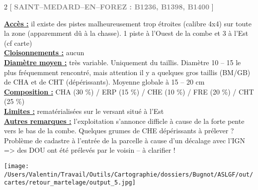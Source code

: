 \documentclass[a4paper,openany]{book}\usepackage[]{graphicx}\usepackage[]{color}
\begin{document}
\begin{multicols}{2}
[
\textcolor{gray}{
\textbf{
\large SAINT--MEDARD--EN--FOREZ : B1236, B1398, B1400
}}
]

\noindent\textbf{\underline{Accès :}} il existe des pistes malheureusement trop étroites (calibre 4x4) sur toute la zone (apparemment dû à la chasse). 1 piste à l'Ouest de la combe et 3 à l'Est (cf carte)\\

\noindent\textbf{\underline{Cloisonnements :}} aucun\\

\noindent\textbf{\underline{Diamètre moyen :}} très variable. Uniquement du taillis. Diamètre 10 -- 15 le plus fréquemment rencontré, mais attention il y a quelques gros taillis (BM/GB) de CHA et de CHT (dépérissants). Moyenne globale à 15 -- 20 cm\\

\noindent\textbf{\underline{Composition :}} CHA (30 \%) / ERP (15 \%) / CHE (10 \%) / FRE (20 \%) /  CHT (25 \%)\\

\noindent\textbf{\underline{Limites :}} rematérialisées sur le versant situé à l'Est\\

\noindent\textbf{\underline{Autres remarques :}} l'exploitation s'annonce difficle à cause de la forte pente vers le bas de la combe.
Quelques grumes de CHE dépérissants à prélever ?
Problème de cadastre à l'entrée de la parcelle à cause d'un décalage avec l'IGN => des DOU ont été prélevés par le voisin -- à clarifier !
\end{multicols}

\begin{center}
\texttt{[image: /Users/Valentin/Travail/Outils/Cartographie/dossiers/Bugnot/ASLGF/out/cartes/retour\_martelage/output\_5.jpg]}
\end{center}
\end{document}
